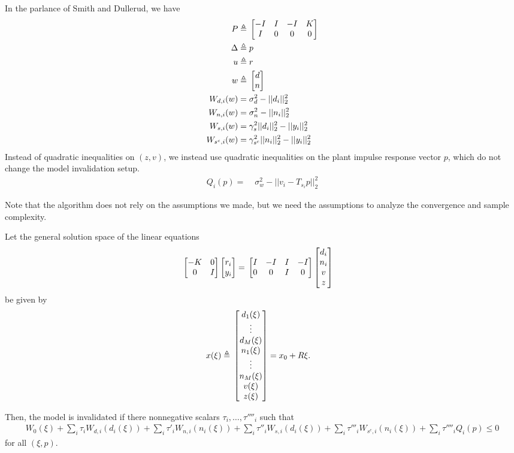 \documentclass[11pt, onecolumn]{article}
\newcommand{\rb}[1]{{\color{red}{Ross: #1}}}
\begin{document}
\rb{I forget which covariance constraint things we came up with}
In the parlance of Smith and Dullerud, we have
\begin{align*}
P \triangleq &\; \begin{bmatrix}-I & I & -I & K\\I & 0 & 0 & 0\end{bmatrix}\\
\Delta \triangleq &\; p \\
u \triangleq &\; r \\
w \triangleq &\; \begin{bmatrix}d\\n\end{bmatrix}\\
W_{d,i}(w) = &\; \sigma_d^2 - ||d_i||_2^2\\
W_{n,i}(w) = &\; \sigma_n^2 - ||n_i||_2^2\\
W_{s,i}(w) = &\; \gamma_s^2||d_i||_2^2 - ||y_i||_2^2\\
W_{s^c,i}(w) = &\; \gamma_{s^c}^2||n_i||_2^2 - ||y_i||_2^2\\
\end{align*}
Instead of quadratic inequalities on $(z,v)$, we instead use quadratic inequalities on the plant impulse response vector $p$, which do not change the model invalidation setup.
\begin{align*}
Q_i(p) = &\; \sigma_w^2 - ||v_i - T_{s_i}p||_2^2
\end{align*}
\rb{Todo: quadratic equality constraints}

\begin{remark}
  Note that the algorithm does not rely on the assumptions we made, but we need the assumptions to
  analyze the convergence and sample complexity.
\end{remark}

\begin{theorem}
  Let the general solution space of the linear equations
    \begin{align*}
      \begin{bmatrix}-K & 0\\0&I\end{bmatrix}\begin{bmatrix}r_i\\y_i\end{bmatrix} = &\; \begin{bmatrix}I&-I&I&-I\\0&0&I&0\end{bmatrix}\begin{bmatrix}d_i\\n_i\\v\\z\end{bmatrix}
    \end{align*}
  be given by \\
  \begin{align*}
    x(\xi) \triangleq&\; \begin{bmatrix}d_1(\xi)\\\vdots\\d_M(\xi)\\n_1(\xi)\\\vdots\\n_M(\xi)\\v(\xi)\\z(\xi)\end{bmatrix}= x_0 + R\xi.
  \end{align*}

  Then, the model is invalidated if there nonnegative scalars $\tau_i,\ldots,\tau''''_i$ such that
  \begin{align*}
   W_0(\xi) + \sum_i \tau_i W_{d,i}(d_i(\xi)) + \sum_i \tau'_i W_{n,i}(n_i(\xi)) + \sum_i \tau''_i W_{s,i}(d_i(\xi)) + \sum_i \tau'''_i W_{s^c,i}(n_i(\xi)) + \sum_i \tau''''_i Q_i(p) \leq 0
  \end{align*}
  for all $(\xi,p)$.
\end{theorem}
\end{document}
